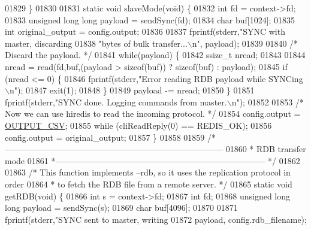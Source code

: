 \begin{DoxyCode}
{{{{{{{{{{{{{{{{{{{{{{{{{{{{{{{{{{{{{{{{{{{{{{{{01829 \}
01830 
01831 \textcolor{keyword}{static} \textcolor{keywordtype}{void} slaveMode(\textcolor{keywordtype}{void}) \{
01832     \textcolor{keywordtype}{int} fd = context->fd;
01833     \textcolor{keywordtype}{unsigned} \textcolor{keywordtype}{long} \textcolor{keywordtype}{long} payload = sendSync(fd);
01834     \textcolor{keywordtype}{char} buf[1024];
01835     \textcolor{keywordtype}{int} original\_output = config.output;
01836 
01837     fprintf(stderr,\textcolor{stringliteral}{"SYNC with master, discarding %
01838                    \textcolor{stringliteral}{"bytes of bulk transfer...\(\backslash\)n"}, payload);
01839 
01840     \textcolor{comment}{/* Discard the payload. */}
01841     \textcolor{keywordflow}{while}(payload) \{
01842         ssize\_t nread;
01843 
01844         nread = read(fd,buf,(payload > \textcolor{keyword}{sizeof}(buf)) ? \textcolor{keyword}{sizeof}(buf) : payload);
01845         \textcolor{keywordflow}{if} (nread <= 0) \{
01846             fprintf(stderr,\textcolor{stringliteral}{"Error reading RDB payload while SYNCing\(\backslash\)n"});
01847             exit(1);
01848         \}
01849         payload -= nread;
01850     \}
01851     fprintf(stderr,\textcolor{stringliteral}{"SYNC done. Logging commands from master.\(\backslash\)n"});
01852 
01853     \textcolor{comment}{/* Now we can use hiredis to read the incoming protocol. */}
01854     config.output = \hyperlink{redis-cli_8c_a55fcc3cb9516c34eebf22ac9f8ebf3a2}{OUTPUT\_CSV};
01855     \textcolor{keywordflow}{while} (cliReadReply(0) == REDIS\_OK);
01856     config.output = original\_output;
01857 \}
01858 
01859 \textcolor{comment}{/*------------------------------------------------------------------------------}
01860 \textcolor{comment}{ * RDB transfer mode}
01861 \textcolor{comment}{ *--------------------------------------------------------------------------- */}
01862 
01863 \textcolor{comment}{/* This function implements --rdb, so it uses the replication protocol in order}
01864 \textcolor{comment}{ * to fetch the RDB file from a remote server. */}
01865 \textcolor{keyword}{static} \textcolor{keywordtype}{void} getRDB(\textcolor{keywordtype}{void}) \{
01866     \textcolor{keywordtype}{int} s = context->fd;
01867     \textcolor{keywordtype}{int} fd;
01868     \textcolor{keywordtype}{unsigned} \textcolor{keywordtype}{long} \textcolor{keywordtype}{long} payload = sendSync(s);
01869     \textcolor{keywordtype}{char} buf[4096];
01870 
01871     fprintf(stderr,\textcolor{stringliteral}{"SYNC sent to master, writing %
01872         payload, config.rdb\_filename);
}}}}}}}}}}}}}}}}}}}}}}}}}}}}}}}}}}}}}}}}}}}}}}}}}}
\end{DoxyCode}
